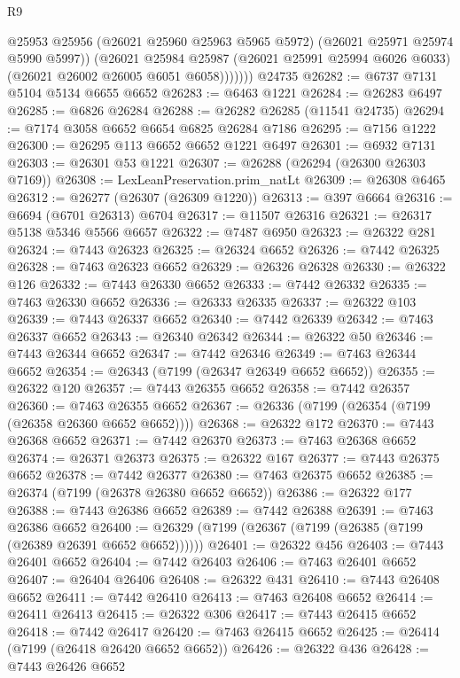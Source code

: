 \begin{lexlean}{R9}
\begin{coremodule}
                @25953
                @25956
                (@26021 @25960 @25963 @5965 @5972)
                (@26021 @25971 @25974 @5990 @5997))
              (@26021
                @25984
                @25987
                (@26021 @25991 @25994 @6026 @6033)
                (@26021 @26002 @26005 @6051 @6058)))))))
    @24735
@26282 := @6737 @7131 @5104 @5134 @6655 @6652
@26283 := @6463 @1221
@26284 := @26283 @6497
@26285 := @6826 @26284
@26288 := @26282 @26285 (@11541 @24735)
@26294 := @7174 @3058 @6652 @6654 @6825 @26284 @7186
@26295 := @7156 @1222
@26300 := @26295 @113 @6652 @6652 @1221 @6497
@26301 := @6932 @7131
@26303 := @26301 @53 @1221
@26307 := @26288 (@26294 (@26300 @26303 @7169))
@26308 := LexLeanPreservation.prim_natLt
@26309 := @26308 @6465
@26312 := @26277 (@26307 (@26309 @1220))
@26313 := @397 @6664
@26316 := @6694 (@6701 @26313) @6704
@26317 := @11507 @26316
@26321 := @26317 @5138 @5346 @5566 @6657
@26322 := @7487 @6950
@26323 := @26322 @281
@26324 := @7443 @26323
@26325 := @26324 @6652
@26326 := @7442 @26325
@26328 := @7463 @26323 @6652
@26329 := @26326 @26328
@26330 := @26322 @126
@26332 := @7443 @26330 @6652
@26333 := @7442 @26332
@26335 := @7463 @26330 @6652
@26336 := @26333 @26335
@26337 := @26322 @103
@26339 := @7443 @26337 @6652
@26340 := @7442 @26339
@26342 := @7463 @26337 @6652
@26343 := @26340 @26342
@26344 := @26322 @50
@26346 := @7443 @26344 @6652
@26347 := @7442 @26346
@26349 := @7463 @26344 @6652
@26354 := @26343 (@7199 (@26347 @26349 @6652 @6652))
@26355 := @26322 @120
@26357 := @7443 @26355 @6652
@26358 := @7442 @26357
@26360 := @7463 @26355 @6652
@26367 := @26336 (@7199 (@26354 (@7199 (@26358 @26360 @6652 @6652))))
@26368 := @26322 @172
@26370 := @7443 @26368 @6652
@26371 := @7442 @26370
@26373 := @7463 @26368 @6652
@26374 := @26371 @26373
@26375 := @26322 @167
@26377 := @7443 @26375 @6652
@26378 := @7442 @26377
@26380 := @7463 @26375 @6652
@26385 := @26374 (@7199 (@26378 @26380 @6652 @6652))
@26386 := @26322 @177
@26388 := @7443 @26386 @6652
@26389 := @7442 @26388
@26391 := @7463 @26386 @6652
@26400 := @26329 (@7199 (@26367 (@7199 (@26385 (@7199 (@26389 @26391 @6652 @6652))))))
@26401 := @26322 @456
@26403 := @7443 @26401 @6652
@26404 := @7442 @26403
@26406 := @7463 @26401 @6652
@26407 := @26404 @26406
@26408 := @26322 @431
@26410 := @7443 @26408 @6652
@26411 := @7442 @26410
@26413 := @7463 @26408 @6652
@26414 := @26411 @26413
@26415 := @26322 @306
@26417 := @7443 @26415 @6652
@26418 := @7442 @26417
@26420 := @7463 @26415 @6652
@26425 := @26414 (@7199 (@26418 @26420 @6652 @6652))
@26426 := @26322 @436
@26428 := @7443 @26426 @6652

\end{coremodule}
\end{lexlean}
